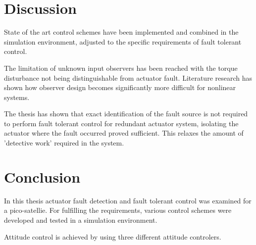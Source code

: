 
\section{Discussion}

State of the art control schemes have been implemented and combined in the simulation environment, adjusted to the specific requirements of fault tolerant control.

The limitation of unknown input observers has been reached with the torque disturbance not being distinguishable from actuator fault. Literature research has shown how observer design becomes significantly more difficult for nonlinear systems.

The thesis has shown that exact identification of the fault source is not required to perform fault tolerant control for redundant actuator system, isolating the actuator where the fault occurred proved sufficient. This relaxes the amount of 'detective work' required in the system.

\section{Conclusion}
In this thesis actuator fault detection and fault tolerant control was examined for a pico-satellie. For fulfilling the requirements, various control schemes were developed and tested in a simulation environment.

Attitude control is achieved by using three different attitude controlers. 

